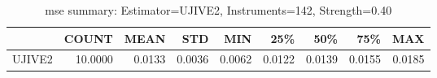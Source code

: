 \begin{table}[ht]
\centering
\caption{mse summary: Estimator=UJIVE2, Instruments=142, Strength=0.40}
\begin{tabular}{lrrrrrrrr}
\toprule
 & COUNT & MEAN & STD & MIN & 25\% & 50\% & 75\% & MAX \\
\midrule
UJIVE2 & 10.0000 & 0.0133 & 0.0036 & 0.0062 & 0.0122 & 0.0139 & 0.0155 & 0.0185 \\
\bottomrule
\end{tabular}
\end{table}
